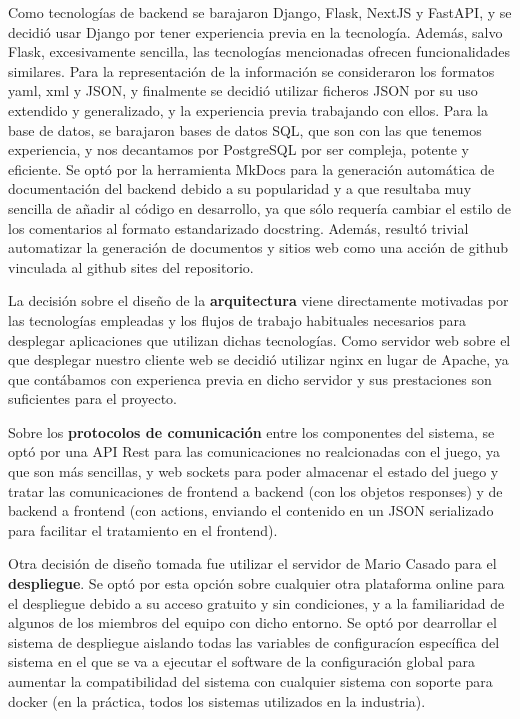 \documentclass[11pt]{article}
\begin{document}
Como tecnologías de backend se barajaron Django, Flask, NextJS y FastAPI, y se
decidió usar Django por tener experiencia previa en la tecnología. 
Además, salvo Flask, excesivamente sencilla,
las tecnologías mencionadas ofrecen funcionalidades similares.
Para la representación de la información se
consideraron los formatos yaml, xml y JSON, y finalmente se decidió
utilizar ficheros JSON por su uso extendido y generalizado, y la experiencia
previa trabajando con ellos.
Para la base de datos, se barajaron bases de datos SQL, que son con las
que tenemos experiencia, y nos decantamos por PostgreSQL por ser
compleja, potente y eficiente.
Se optó por la herramienta MkDocs para la generación automática de 
documentación del backend debido a su popularidad y a que resultaba muy 
sencilla de añadir al código en desarrollo, ya que sólo requería cambiar
el estilo de los comentarios al formato estandarizado docstring. Además,
resultó trivial automatizar la generación de documentos y sitios web como una 
acción de github vinculada al github sites del repositorio.

La decisión sobre el diseño de la \textbf{arquitectura} viene directamente motivadas
por las tecnologías empleadas y los flujos de trabajo habituales necesarios
para desplegar aplicaciones que utilizan dichas tecnologías.
Como servidor web sobre el que desplegar nuestro cliente web se decidió
utilizar nginx en lugar de Apache, ya que contábamos con experienca previa
en dicho servidor y sus prestaciones son suficientes para el proyecto.

Sobre los \textbf{protocolos de comunicación} entre los componentes del sistema,
se optó por una API Rest para las comunicaciones no realcionadas con el
juego, ya que son más sencillas, y web sockets para poder almacenar el
estado del juego y tratar las comunicaciones de frontend a backend
(con los objetos responses) y de backend a frontend (con actions, enviando
el contenido en un JSON serializado para facilitar el tratamiento en el
frontend).

Otra decisión de diseño tomada fue utilizar el servidor de Mario Casado para
el \textbf{despliegue}. Se optó por esta opción sobre cualquier otra plataforma online
para el despliegue debido a su acceso gratuito y sin condiciones, y a la
familiaridad de algunos de los miembros del equipo con dicho entorno.
Se optó por dearrollar el sistema de despliegue aislando todas las variables
de configuracíon específica del sistema en el que se va a ejecutar el software
de la configuración global para aumentar la compatibilidad del sistema con
cualquier sistema con soporte para docker (en la práctica, todos los 
sistemas utilizados en la industria).
\end{document}
